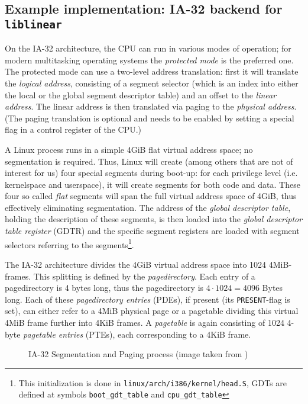 \subsection{Example implementation: IA-32 backend for \texttt{liblinear}}

On the IA-32 architecture, the CPU can run in various modes of operation; for
modern multitasking operating systems the \emph{protected mode} is the preferred
one.  The protected mode can use a two-level address translation: first it will
translate the \emph {logical address}, consisting of a segment selector (which
is an index into either the local or the global segment descriptor table) and an
offset to the \emph{linear address}.  The linear address is then translated via
paging to the \emph{physical address}. (The paging translation is optional and
needs to be enabled by setting a special flag in a control register of the CPU.)

\label{linux_gdt} A Linux process runs in a simple 4GiB flat virtual address
space; no segmentation is required. Thus, Linux will create (among others that
are not of interest for us) four special segments during boot-up: for each
privilege level (i.e. kernelspace and userspace), it will create segments for
both code and data. These four so called \emph{flat} segments will span the full
virtual address space of 4GiB, thus effectively eliminating segmentation. The
address of the \emph{global descriptor table}, holding the description of these
segments, is then loaded into the \emph{global descriptor table register} (GDTR)
and the specific segment registers are loaded with segment selectors referring
to the segments\footnote{This initialization is done in
\texttt{linux/arch/i386/kernel/head.S}, GDTs are defined at symbols
\texttt{boot\_gdt\_table} and \texttt{cpu\_gdt\_table}}.

The IA-32 architecture divides the 4GiB virtual address space into 1024
4MiB-frames. This splitting is defined by the \emph{pagedirectory}. Each entry
of a pagedirectory is 4 bytes long, thus the pagedirectory is $4 \cdot 1024 =
4096$ Bytes long. Each of these \emph{pagedirectory entries} (PDEs), if present
(its \texttt{PRESENT}-flag is set), can either refer to a 4MiB physical page or
a pagetable dividing this virtual 4MiB frame further into 4KiB frames. A
\emph{pagetable} is again consisting of 1024 4-byte \emph{pagetable entries}
(PTEs), each corresponding to a 4KiB frame.

\begin{figure}[ht] \begin{center}

	\epsfysize 9.5cm


	\caption{IA-32 Segmentation and Paging process (image taken from
	\cite{IA32_SDM_3a:2006})}

	\label{fig:ia32_segmentation_paging}

\end{center}\end{figure}

